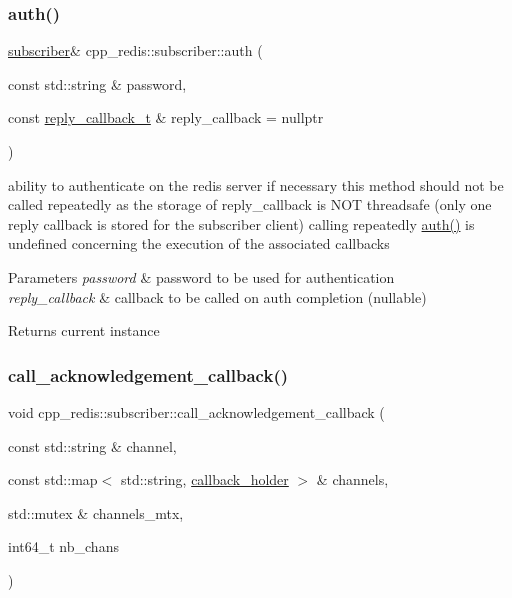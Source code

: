 \subsubsection{\texorpdfstring{auth()}{auth()}}
{\footnotesize\ttfamily \hyperlink{classcpp__redis_1_1subscriber}{subscriber}\& cpp\+\_\+redis\+::subscriber\+::auth (\begin{DoxyParamCaption}\item[{const std\+::string \&}]{password,  }\item[{const \hyperlink{classcpp__redis_1_1subscriber_a99d220cc662664e2399b709f61ac9581}{reply\+\_\+callback\+\_\+t} \&}]{reply\+\_\+callback = {\ttfamily nullptr} }\end{DoxyParamCaption})}

ability to authenticate on the redis server if necessary this method should not be called repeatedly as the storage of reply\+\_\+callback is N\+OT threadsafe (only one reply callback is stored for the subscriber client) calling repeatedly \hyperlink{classcpp__redis_1_1subscriber_a7b4564fc4dfe356b95aeae4fdb8071c9}{auth()} is undefined concerning the execution of the associated callbacks


\begin{DoxyParams}{Parameters}
{\em password} & password to be used for authentication \\
\hline
{\em reply\+\_\+callback} & callback to be called on auth completion (nullable) \\
\hline
\end{DoxyParams}
\begin{DoxyReturn}{Returns}
current instance 
\end{DoxyReturn}
\mbox{\label{classcpp__redis_1_1subscriber_a8cbe2790b1e0f803f41a403ed8c66513}} 
\subsubsection{\texorpdfstring{call\+\_\+acknowledgement\+\_\+callback()}{call\_acknowledgement\_callback()}}
{\footnotesize\ttfamily void cpp\+\_\+redis\+::subscriber\+::call\+\_\+acknowledgement\+\_\+callback (\begin{DoxyParamCaption}\item[{const std\+::string \&}]{channel,  }\item[{const std\+::map$<$ std\+::string, \hyperlink{structcpp__redis_1_1subscriber_1_1callback__holder}{callback\+\_\+holder} $>$ \&}]{channels,  }\item[{std\+::mutex \&}]{channels\+\_\+mtx,  }\item[{int64\+\_\+t}]{nb\+\_\+chans }\end{DoxyParamCaption})\hspace{0.3cm}{\ttfamily [private]}}

